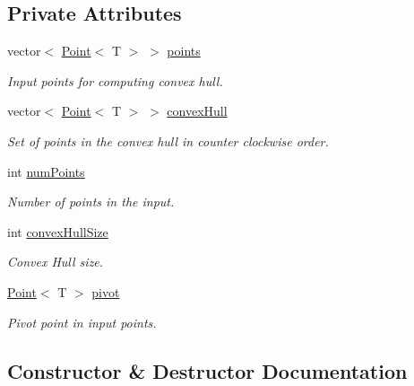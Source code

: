 \subsection*{Private Attributes}
\begin{DoxyCompactItemize}
\item 
vector$<$ \mbox{\hyperlink{classPoint}{Point}}$<$ T $>$ $>$ \mbox{\hyperlink{classChan_a492d7e3f31f1fd1e06f5ff464eec0492}{points}}
\begin{DoxyCompactList}\small\item\em Input points for computing convex hull. \end{DoxyCompactList}\item 
vector$<$ \mbox{\hyperlink{classPoint}{Point}}$<$ T $>$ $>$ \mbox{\hyperlink{classChan_a6b189fb8de493f51a989f5c90dc7bbcc}{convex\+Hull}}
\begin{DoxyCompactList}\small\item\em Set of points in the convex hull in counter clockwise order. \end{DoxyCompactList}\item 
int \mbox{\hyperlink{classChan_a9f5d5339db322fa4a378af0832b31da9}{num\+Points}}
\begin{DoxyCompactList}\small\item\em Number of points in the input. \end{DoxyCompactList}\item 
int \mbox{\hyperlink{classChan_a366f3dd178f14b5e146e6a80aea8e039}{convex\+Hull\+Size}}
\begin{DoxyCompactList}\small\item\em Convex Hull size. \end{DoxyCompactList}\item 
\mbox{\hyperlink{classPoint}{Point}}$<$ T $>$ \mbox{\hyperlink{classChan_a601408ef7e50863dd345e86e519710bc}{pivot}}
\begin{DoxyCompactList}\small\item\em Pivot point in input points. \end{DoxyCompactList}\end{DoxyCompactItemize}


\subsection{Constructor \& Destructor Documentation}
\mbox{\label{classChan_ae9805532068f340bfc2947bd48796f31}} 
